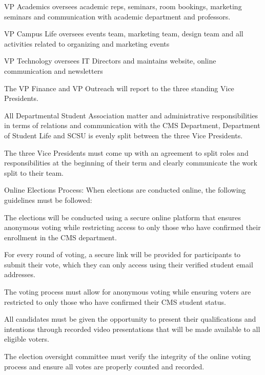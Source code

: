 \documentclass[12pt,a4paper]{article}
\begin{document}
\begin{constitutionlist}
\begin{constitutionlist}
\item VP Academics oversees academic reps, seminars, room bookings, marketing seminars and communication with academic department and professors.

\item VP Campus Life oversees events team, marketing team, design team and all activities related to organizing and marketing events

\item VP Technology oversees IT Directors and maintains website, online communication and newsletters

\item The VP Finance and VP Outreach will report to the three standing Vice Presidents.

\item All Departmental Student Association matter and administrative responsibilities in terms of relations and communication with the CMS Department, Department of Student Life and SCSU is evenly split between the three Vice Presidents.

\item The three Vice Presidents must come up with an agreement to split roles and responsibilities at the beginning of their term and clearly communicate the work split to their team.
\end{constitutionlist}

\item Online Elections Process: When elections are conducted online, the following guidelines must be followed:

\begin{constitutionlist}
\item The elections will be conducted using a secure online platform that ensures anonymous voting while restricting access to only those who have confirmed their enrollment in the CMS department.

\item For every round of voting, a secure link will be provided for participants to submit their vote, which they can only access using their verified student email addresses.

\item The voting process must allow for anonymous voting while ensuring voters are restricted to only those who have confirmed their CMS student status.

\item All candidates must be given the opportunity to present their qualifications and intentions through recorded video presentations that will be made available to all eligible voters.

\item The election oversight committee must verify the integrity of the online voting process and ensure all votes are properly counted and recorded.
\end{constitutionlist}
\end{constitutionlist}
\end{document}
